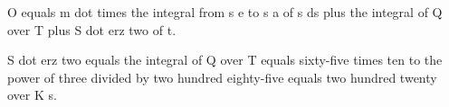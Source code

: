 O equals m dot times the integral from s e to s a of s ds plus the integral of Q over T plus S dot erz two of t.

S dot erz two equals the integral of Q over T equals sixty-five times ten to the power of three divided by two hundred eighty-five equals two hundred twenty over K s.